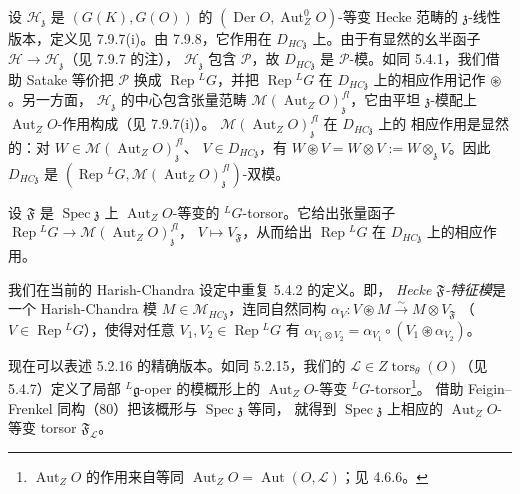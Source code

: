设 $\mathcal{H}_{\mathfrak{z}}$ 是 $(G(K),G(O))$ 的
$(\operatorname{Der}O,\operatorname{Aut}^{0}_{Z}O)$-等变 Hecke 范畴的
$\mathfrak{z}$-线性版本，定义见 7.9.7(i)。由 7.9.8，它作用在
$D_{HC\mathfrak{z}}$ 上。由于有显然的幺半函子
$\mathcal{H}\to\mathcal{H}_{\mathfrak{z}}$（见 7.9.7 的注），
$\mathcal{H}_{\mathfrak{z}}$ 包含 $\mathcal{P}$，故 $D_{HC\mathfrak{z}}$ 是
$\mathcal{P}$-模。如同 5.4.1，我们借助 Satake 等价把 $\mathcal{P}$ 换成
$\operatorname{Rep}{}^{L}G$，并把 $\operatorname{Rep}{}^{L}G$ 在
$D_{HC\mathfrak{z}}$ 上的相应作用记作 $\circledast$。另一方面，
$\mathcal{H}_{\mathfrak{z}}$ 的中心包含张量范畴
$\mathcal{M}(\operatorname{Aut}_ZO)^{fl}_{\mathfrak{z}}$，它由平坦
$\mathfrak{z}$-模配上 $\operatorname{Aut}_ZO$-作用构成（见 7.9.7(i)）。
$\mathcal{M}(\operatorname{Aut}_ZO)^{fl}_{\mathfrak{z}}$ 在 $D_{HC\mathfrak{z}}$ 上的
相应作用是显然的：对 $W\in\mathcal{M}(\operatorname{Aut}_ZO)^{fl}_{\mathfrak{z}}$、
$V\in D_{HC\mathfrak{z}}$，有
$W\circledast V=W\otimes V:=W\otimes_{\mathfrak{z}}V$。因此
$D_{HC\mathfrak{z}}$ 是
$(\operatorname{Rep}{}^{L}G,\mathcal{M}(\operatorname{Aut}_ZO)^{fl}_{\mathfrak{z}})$-双模。

设 $\mathfrak{F}$ 是 $\operatorname{Spec}\mathfrak{z}$ 上
$\operatorname{Aut}_ZO$-等变的 ${}^{L}G$-torsor。它给出张量函子
$\operatorname{Rep}{}^{L}G\to\mathcal{M}(\operatorname{Aut}_ZO)^{fl}_{\mathfrak{z}}$，
$V\mapsto V_{\mathfrak{F}}$，从而给出 $\operatorname{Rep}{}^{L}G$ 在
$D_{HC\mathfrak{z}}$ 上的相应作用。

 我们在当前的 Harish-Chandra 设定中重复 5.4.2 的定义。即，
\emph{Hecke $\mathfrak{F}$-特征模}是一个 Harish-Chandra 模
$M\in\mathcal{M}_{HC\mathfrak{z}}$，连同自然同构
$\alpha_V:V\circledast M\xrightarrow{\sim}M\otimes V_{\mathfrak{F}}$
（$V\in\operatorname{Rep}{}^{L}G$），使得对任意
$V_1,V_2\in\operatorname{Rep}{}^{L}G$ 有
$\alpha_{V_1\otimes V_2}=\alpha_{V_1}\circ(V_1\circledast\alpha_{V_2})$。

现在可以表述 5.2.16 的精确版本。如同 5.2.15，我们的
$\mathcal{L}\in Z\operatorname{tors}_{\theta}(O)$（见 5.4.7）定义了局部
${}^{L}\mathfrak{g}$-oper 的模概形上的 $\operatorname{Aut}_ZO$-等变
${}^{L}G$-torsor\footnote{$\operatorname{Aut}_ZO$ 的作用来自等同
$\operatorname{Aut}_ZO=\operatorname{Aut}(O,\mathcal{L})$；见 4.6.6。}。
借助 Feigin--Frenkel 同构（80）把该概形与 $\operatorname{Spec}\mathfrak{z}$ 等同，
就得到 $\operatorname{Spec}\mathfrak{z}$ 上相应的
$\operatorname{Aut}_ZO$-等变 torsor $\mathfrak{F}_{\mathcal{L}}$。


